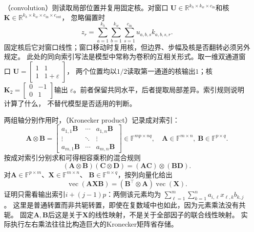 （convolution）则读取局部位置并复用固定核。对窗口
$\bm U\in\mathbb R^{k_h\times k_w\times c_{\mathrm{in}}}$和核
$\bm K\in\mathbb R^{k_h\times k_w\times c_{\mathrm{in}}\times c_{\mathrm{out}}}$，
忽略偏置时
\begin{equation}
 z_r=\sum_{a=1}^{k_h}\sum_{b=1}^{k_w}\sum_{s=1}^{c_{\mathrm{in}}}
 u_{a,b,s}k_{a,b,s,r}.
 \label{eq:linear-algebra-convolution-window-contraction}
\end{equation}
固定核后它对窗口线性；窗口移动时复用核，但边界、步幅及核是否翻转必须另外规定。
此处的同向索引写法是模型中常称为卷积的互相关形式。取一维双通道窗口
$\bm U=\left[\begin{smallmatrix}1&1\\1&1+\varepsilon\end{smallmatrix}\right]$，
两个位置均以$1/2$读取第一通道的核输出$1$；核
$\bm K_2=\left[\begin{smallmatrix}0&-1\\0&1\end{smallmatrix}\right]$输出
$\varepsilon$。前者保留共同水平，后者提取局部差异。索引规则说明计算了什么，
不替代模型是否适用的判断。

两组轴分别作用时，（Kronecker product）记录成对索引：
\begin{equation}
 \bm A\otimes\bm B
 =\begin{bmatrix}
 a_{1,1}\bm B&\cdots&a_{1,n}\bm B\\
 \vdots&\ddots&\vdots\\
 a_{m,1}\bm B&\cdots&a_{m,n}\bm B
 \end{bmatrix}\in\mathbb F^{mp\times nq},
 \quad
 \bm A\in\mathbb F^{m\times n},\ \bm B\in\mathbb F^{p\times q}.
 \label{eq:linear-algebra-kronecker-product}
\end{equation}
按成对索引分别求和可得相容乘积的混合规则
\begin{equation}
 (\bm A\otimes\bm B)(\bm C\otimes\bm D)
 =(\bm A\bm C)\otimes(\bm B\bm D).
 \label{eq:matrix-analysis-kronecker-mixed-product}
\end{equation}
对$\bm A\in\mathbb F^{p\times m}$、$\bm X\in\mathbb F^{m\times n}$、
$\bm B\in\mathbb F^{n\times q}$，按列向量化给出
\begin{equation}
 \operatorname{vec}(\bm A\bm X\bm B)
 =(\bm B^\top\otimes\bm A)\operatorname{vec}(\bm X).
 \label{eq:matrix-analysis-vec-kronecker}
\end{equation}
证明只需看输出索引$i+(j-1)p$：两侧该元素均为
$\sum_{\ell=1}^m\sum_{k=1}^n a_{i,\ell}x_{\ell,k}b_{k,j}$。
这里是普通转置而非共轭转置，即使在复数域中也如此，因为元素乘法没有共轭。
固定$\bm A,\bm B$后这是关于$\bm X$的线性映射，不是关于全部因子的联合线性映射。
实际执行左右乘法往往比构造巨大的Kronecker矩阵省存储。

